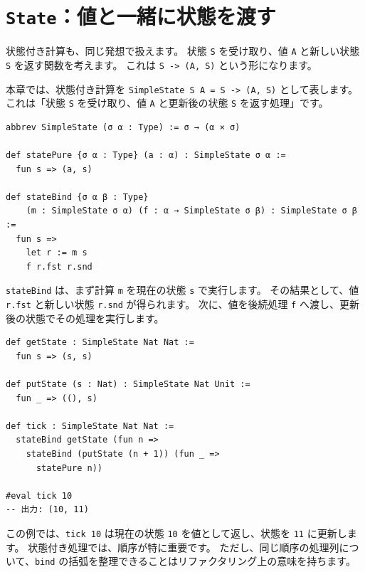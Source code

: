 \section{\texttt{State}：値と一緒に状態を渡す}

状態付き計算も、同じ発想で扱えます。
状態 \texttt{S} を受け取り、値 \texttt{A} と新しい状態 \texttt{S} を返す関数を考えます。
これは \texttt{S -> (A, S)} という形になります。

本章では、状態付き計算を \texttt{SimpleState S A = S -> (A, S)} として表します。
これは「状態 \texttt{S} を受け取り、値 \texttt{A} と更新後の状態 \texttt{S} を返す処理」です。

\begin{listing}[htbp]
\begin{verbatim}
abbrev SimpleState (σ α : Type) := σ → (α × σ)

def statePure {σ α : Type} (a : α) : SimpleState σ α :=
  fun s => (a, s)

def stateBind {σ α β : Type}
    (m : SimpleState σ α) (f : α → SimpleState σ β) : SimpleState σ β :=
  fun s =>
    let r := m s
    f r.fst r.snd
\end{verbatim}
\caption{\texttt{SimpleState}}
\label{lst:ch17_state}
\end{listing}

\texttt{stateBind} は、まず計算 \texttt{m} を現在の状態 \texttt{s} で実行します。
その結果として、値 \texttt{r.fst} と新しい状態 \texttt{r.snd} が得られます。
次に、値を後続処理 \texttt{f} へ渡し、更新後の状態でその処理を実行します。

\begin{listing}[htbp]
\begin{verbatim}
def getState : SimpleState Nat Nat :=
  fun s => (s, s)

def putState (s : Nat) : SimpleState Nat Unit :=
  fun _ => ((), s)

def tick : SimpleState Nat Nat :=
  stateBind getState (fun n =>
    stateBind (putState (n + 1)) (fun _ =>
      statePure n))

#eval tick 10
-- 出力: (10, 11)
\end{verbatim}
\caption{\texttt{tick}}
\label{lst:ch17_state_example}
\end{listing}

この例では、\texttt{tick 10} は現在の状態 \texttt{10} を値として返し、状態を \texttt{11} に更新します。
状態付き処理では、順序が特に重要です。
ただし、同じ順序の処理列について、\texttt{bind} の括弧を整理できることはリファクタリング上の意味を持ちます。

